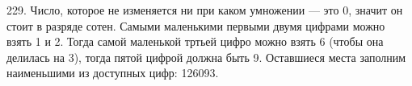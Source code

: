 229. Число, которое не изменяется ни при каком умножении --- это 0, значит он стоит в разряде сотен. Самыми маленькими первыми двумя цифрами можно взять 1 и 2. Тогда самой маленькой тртьей цифро можно взять 6 (чтобы она делилась на 3), тогда пятой цифрой должна быть 9. Оставшиеся места заполним наименьшими из доступных цифр: 126093.\\
